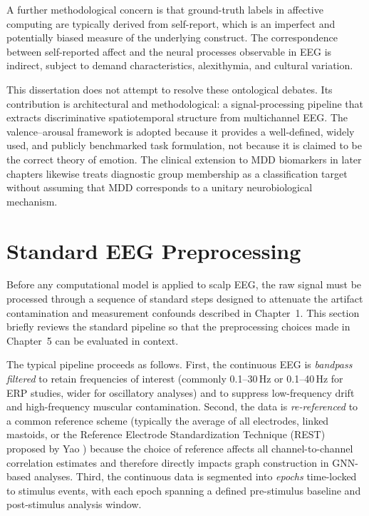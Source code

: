 A further methodological concern is that ground-truth labels in affective computing are typically derived from self-report, which is an imperfect and potentially biased measure of the underlying construct. The correspondence between self-reported affect and the neural processes observable in EEG is indirect, subject to demand characteristics, alexithymia, and cultural variation.

This dissertation does not attempt to resolve these ontological debates. Its contribution is architectural and methodological: a signal-processing pipeline that extracts discriminative spatiotemporal structure from multichannel EEG. The valence--arousal framework is adopted because it provides a well-defined, widely used, and publicly benchmarked task formulation, not because it is claimed to be the correct theory of emotion. The clinical extension to MDD biomarkers in later chapters likewise treats diagnostic group membership as a classification target without assuming that MDD corresponds to a unitary neurobiological mechanism.


\section{Standard EEG Preprocessing}
\label{sec:preprocessing}

Before any computational model is applied to scalp EEG, the raw signal must be processed through a sequence of standard steps designed to attenuate the artifact contamination and measurement confounds described in Chapter~1. This section briefly reviews the standard pipeline so that the preprocessing choices made in Chapter~5 can be evaluated in context.

The typical pipeline proceeds as follows. First, the continuous EEG is \emph{bandpass filtered} to retain frequencies of interest (commonly 0.1--30\,Hz or 0.1--40\,Hz for ERP studies, wider for oscillatory analyses) and to suppress low-frequency drift and high-frequency muscular contamination. Second, the data is \emph{re-referenced} to a common reference scheme (typically the average of all electrodes, linked mastoids, or the Reference Electrode Standardization Technique (REST) proposed by Yao \cite{yao_2001}) because the choice of reference affects all channel-to-channel correlation estimates and therefore directly impacts graph construction in GNN-based analyses. Third, the continuous data is segmented into \emph{epochs} time-locked to stimulus events, with each epoch spanning a defined pre-stimulus baseline and post-stimulus analysis window.

